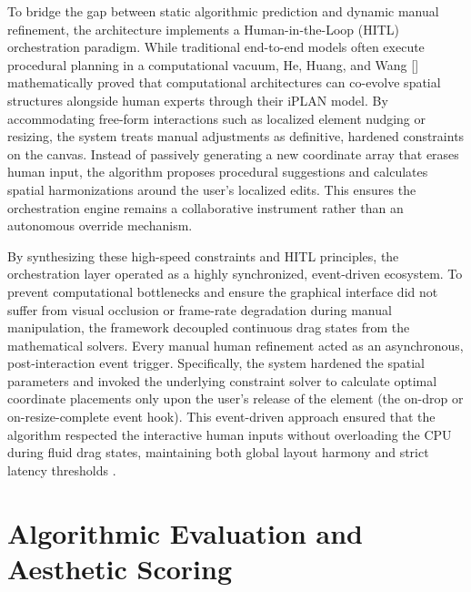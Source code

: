 \begin{refsection}
To bridge the gap between static algorithmic prediction and dynamic manual refinement, the architecture implements a Human-in-the-Loop (HITL) orchestration paradigm. While traditional end-to-end models often execute procedural planning in a computational vacuum, He, Huang, and Wang [\citeyear{He2022iPLAN}] mathematically proved that computational architectures can co-evolve spatial structures alongside human experts through their iPLAN model. By accommodating free-form interactions such as localized element nudging or resizing, the system treats manual adjustments as definitive, hardened constraints on the canvas. Instead of passively generating a new coordinate array that erases human input, the algorithm proposes procedural suggestions and calculates spatial harmonizations around the user's localized edits. This ensures the orchestration engine remains a collaborative instrument rather than an autonomous override mechanism.

By synthesizing these high-speed constraints and HITL principles, the orchestration layer operated as a highly synchronized, event-driven ecosystem. To prevent computational bottlenecks and ensure the graphical interface did not suffer from visual occlusion or frame-rate degradation during manual manipulation, the framework decoupled continuous drag states from the mathematical solvers. Every manual human refinement acted as an asynchronous, post-interaction event trigger. Specifically, the system hardened the spatial parameters and invoked the underlying constraint solver to calculate optimal coordinate placements only upon the user's release of the element (the on-drop or on-resize-complete event hook). This event-driven approach ensured that the algorithm respected the interactive human inputs without overloading the CPU during fluid drag states, maintaining both global layout harmony and strict latency thresholds \cite{Hu2025FacilityLayout, Du2020DepthLab, He2022iPLAN}.

\section{Algorithmic Evaluation and Aesthetic Scoring}


\end{refsection}
